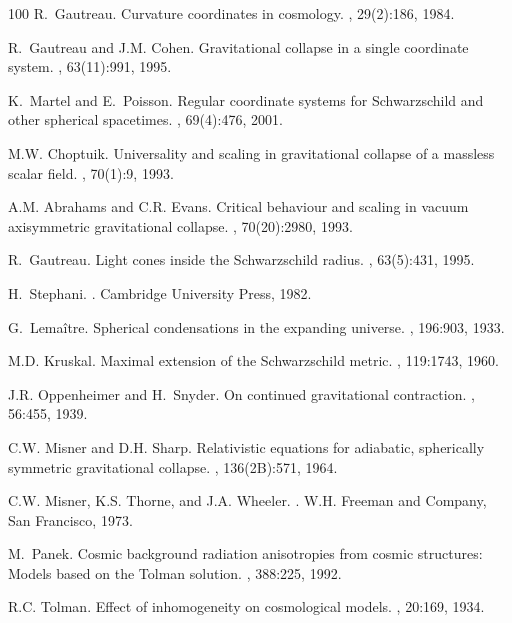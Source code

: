 \documentclass[a4paper]{article}
\numberwithin{equation}{section}
\begin{document}
\begin{thebibliography}{100}
R.~Gautreau.
\newblock Curvature coordinates in cosmology.
, 29(2):186, 1984.

R.~Gautreau and J.M. Cohen.
\newblock Gravitational collapse in a single coordinate system.
, 63(11):991, 1995.

K.~Martel and E.~Poisson.
\newblock Regular coordinate systems for {S}chwarzschild and other spherical
  spacetimes.
, 69(4):476, 2001.

M.W. Choptuik.
\newblock Universality and scaling in gravitational collapse of a massless
  scalar field.
, 70(1):9, 1993.

A.M. Abrahams and C.R. Evans.
\newblock Critical behaviour and scaling in vacuum axisymmetric gravitational
  collapse.
, 70(20):2980, 1993.

R.~Gautreau.
\newblock Light cones inside the {S}chwarzschild radius.
, 63(5):431, 1995.

H.~Stephani.
.
\newblock Cambridge University Press, 1982.

G.~Lema{\^{i}}tre.
\newblock Spherical condensations in the expanding universe.
, 196:903, 1933.

M.D. Kruskal.
\newblock Maximal extension of the {S}chwarzschild metric.
, 119:1743, 1960.

J.R. Oppenheimer and H.~Snyder.
\newblock On continued gravitational contraction.
, 56:455, 1939.

C.W. Misner and D.H. Sharp.
\newblock Relativistic equations for adiabatic, spherically symmetric
  gravitational collapse.
, 136(2B):571, 1964.

C.W. Misner, K.S. Thorne, and J.A. Wheeler.
.
\newblock W.H. Freeman and Company, San Francisco, 1973.

M.~Panek.
\newblock Cosmic background radiation anisotropies from cosmic structures:
  Models based on the {T}olman solution.
, 388:225, 1992.

R.C. Tolman.
\newblock Effect of inhomogeneity on cosmological models.
, 20:169, 1934.


\end{thebibliography}
\end{document}
